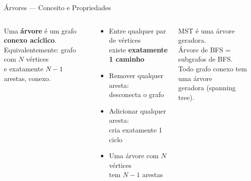 \documentclass[aspectratio=169,10pt]{beamer}
\begin{document}
\begin{frame}{Árvores --- Conceito e Propriedades}
  \begin{columns}[c]
      \begin{tcolorbox}[caixaAzul,title={Definição}]
        \small
        Uma \textbf{árvore} é um grafo \textbf{conexo acíclico}.\\[4pt]
        Equivalentemente: grafo com $N$ vértices\\
        e exatamente $N-1$ arestas, conexo.
      \end{tcolorbox}
      \vspace{0.08cm}
      \begin{tcolorbox}[caixaGrafo,title={Propriedades}]
        \begin{itemize}\footnotesize
          \item Entre qualquer par de vértices\\
                existe \textbf{exatamente 1 caminho}
          \item Remover qualquer aresta:\\
                desconecta o grafo
          \item Adicionar qualquer aresta:\\
                cria exatamente 1 ciclo
          \item Uma árvore com $N$ vértices\\
                tem $N-1$ arestas
        \end{itemize}
      \end{tcolorbox}
      \vspace{0.08cm}
      \begin{tcolorbox}[caixaAmarelo,title={Relação com grafos}]
        \footnotesize
        MST é uma árvore geradora.\\
        Árvore de BFS = subgrafos de BFS.\\
        Todo grafo conexo tem uma árvore\\
        geradora (spanning tree).
      \end{tcolorbox}
      \centering
\end{columns}
\end{frame}
\end{document}

